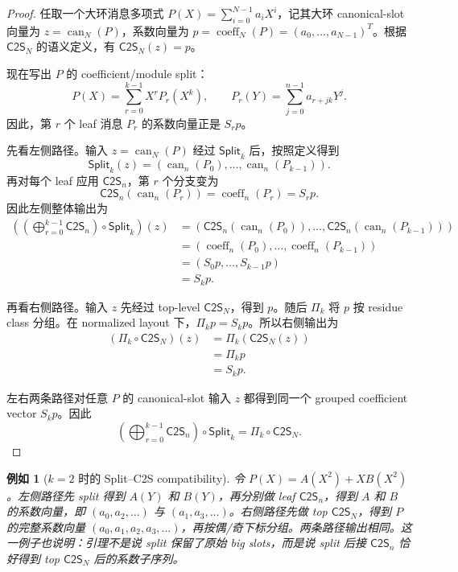\documentclass[UTF8,11pt]{article}
\newcommand{\Split}{\mathsf{Split}}
\newcommand{\CtwoS}{\mathsf{C2S}}
\theoremstyle{definition}
\theoremstyle{plain}
\newtheorem{example}{例如}
\begin{document}
\begin{proof}
任取一个大环消息多项式 \(P(X)=\sum_{i=0}^{N-1}a_iX^i\)，记其大环 canonical-slot 向量为 \(z=\operatorname{can}_N(P)\)，系数向量为 \(p=\operatorname{coeff}_N(P)=(a_0,\ldots,a_{N-1})^T\)。根据 \(\CtwoS_N\) 的语义定义，有 \(\CtwoS_N(z)=p\)。

现在写出 \(P\) 的 coefficient/module split：
\[
P(X)=\sum_{r=0}^{k-1}X^rP_r(X^k),
\qquad
P_r(Y)=\sum_{j=0}^{n-1}a_{r+jk}Y^j.
\]
因此，第 \(r\) 个 leaf 消息 \(P_r\) 的系数向量正是 \(S_rp\)。

先看左侧路径。输入 \(z=\operatorname{can}_N(P)\) 经过 \(\Split_k\) 后，按照定义得到
\[
\Split_k(z)
=
(\operatorname{can}_n(P_0),\ldots,\operatorname{can}_n(P_{k-1})).
\]
再对每个 leaf 应用 \(\CtwoS_n\)，第 \(r\) 个分支变为
\[
\CtwoS_n(\operatorname{can}_n(P_r))
=
\operatorname{coeff}_n(P_r)
=
S_rp.
\]
因此左侧整体输出为
\[
\begin{aligned}
\left(
\left(\bigoplus_{r=0}^{k-1}\CtwoS_n\right)
\circ\Split_k
\right)(z)
&=
(\CtwoS_n(\operatorname{can}_n(P_0)),\ldots,\CtwoS_n(\operatorname{can}_n(P_{k-1})))\\
&=
(\operatorname{coeff}_n(P_0),\ldots,\operatorname{coeff}_n(P_{k-1}))\\
&=
(S_0p,\ldots,S_{k-1}p)\\
&=
S_kp.
\end{aligned}
\]

再看右侧路径。输入 \(z\) 先经过 top-level \(\CtwoS_N\)，得到 \(p\)。随后 \(\Pi_k\) 将 \(p\) 按 residue class 分组。在 normalized layout 下，\(\Pi_kp=S_kp\)。所以右侧输出为
\[
\begin{aligned}
(\Pi_k\circ\CtwoS_N)(z)
&=
\Pi_k(\CtwoS_N(z))\\
&=
\Pi_kp\\
&=
S_kp.
\end{aligned}
\]

左右两条路径对任意 \(P\) 的 canonical-slot 输入 \(z\) 都得到同一个 grouped coefficient vector \(S_kp\)。因此
\[
\left(\bigoplus_{r=0}^{k-1}\CtwoS_n\right)\circ\Split_k
=
\Pi_k\circ\CtwoS_N.
\]
\end{proof}

\begin{example}[\(k=2\) 时的 Split--C2S compatibility]
令 \(P(X)=A(X^2)+XB(X^2)\)。左侧路径先 split 得到 \(A(Y)\) 和 \(B(Y)\)，再分别做 leaf \(\CtwoS_n\)，得到 \(A\) 和 \(B\) 的系数向量，即 \((a_0,a_2,\ldots)\) 与 \((a_1,a_3,\ldots)\)。右侧路径先做 top \(\CtwoS_N\)，得到 \(P\) 的完整系数向量 \((a_0,a_1,a_2,a_3,\ldots)\)，再按偶/奇下标分组。两条路径输出相同。这一例子也说明：引理不是说 split 保留了原始 big slots，而是说 split 后接 \(\CtwoS_n\) 恰好得到 top \(\CtwoS_N\) 后的系数子序列。
\end{example}
\end{document}
